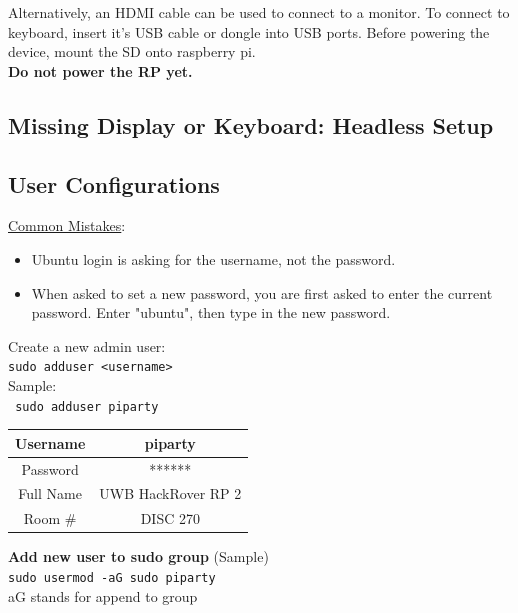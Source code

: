 \documentclass[a4paper, 10pt]{article}
\begin{document}
            \noindent Alternatively, an HDMI cable can be used to connect to a monitor.
            To connect to keyboard, insert it’s USB cable or dongle into USB ports.
            Before powering the device, mount the SD onto raspberry pi. \\
                
            \noindent \textbf{Do not power the RP yet.} 

        \subsection{Missing Display or Keyboard: Headless Setup} 
        

        \subsection{User Configurations}
        \underline{Common Mistakes}:
        \begin{itemize}
            \item Ubuntu login is asking for the username, not the password.
            \item When asked to set a new password, you are first asked to enter the current password. Enter "ubuntu", then type in the new password.
        \end{itemize}
        
        \noindent Create a new admin user:\\
        \texttt{sudo adduser <username>} \\

        \noindent Sample: \\
        \texttt{ sudo adduser piparty} \
        \begin{flushleft}
            \begin{tabular}{|c|c|}
                \hline
                Username & piparty \\
                \hline
                Password & ****** \\
                \hline
                Full Name & UWB HackRover RP 2 \\
                \hline
                Room \# & DISC 270 \\
                \hline
            \end{tabular}
        \end{flushleft} 


        \noindent \textbf{Add new user to sudo group} (Sample)\\
        \texttt{sudo usermod -aG sudo piparty} \\
        aG stands for append to group \\
        
\end{document}

